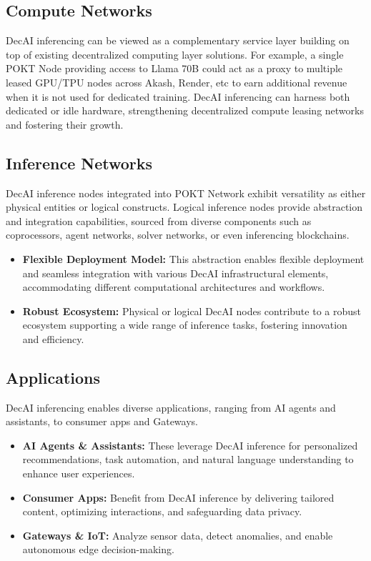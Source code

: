 \documentclass[conference,compsoc]{IEEEtran}
\begin{document}
\subsection{Compute Networks}
DecAI inferencing can be viewed as a complementary service layer building on top of existing decentralized computing layer solutions. For example, a single POKT Node providing access to Llama 70B could act as a proxy to multiple leased GPU/TPU nodes across Akash, Render, etc to earn additional revenue when it is not used for dedicated training. DecAI inferencing can harness both dedicated or idle hardware, strengthening decentralized compute leasing networks and fostering their growth.

\subsection{Inference Networks}
DecAI inference nodes integrated into POKT Network exhibit versatility as either physical entities or logical constructs. Logical inference nodes provide abstraction and integration capabilities, sourced from diverse components such as coprocessors, agent networks, solver networks, or even inferencing blockchains.

\begin{itemize}
    \item \textbf{Flexible Deployment Model:} This abstraction enables flexible deployment and seamless integration with various DecAI infrastructural elements, accommodating different computational architectures and workflows.

    \item \textbf{Robust Ecosystem:} Physical or logical DecAI nodes contribute to a robust ecosystem supporting a wide range of inference tasks, fostering innovation and efficiency.

\end{itemize}

\subsection{Applications}
DecAI inferencing enables diverse applications, ranging from AI agents and assistants, to consumer apps and Gateways.
\begin{itemize}
    \item \textbf{AI Agents \& Assistants:} These leverage DecAI inference for personalized recommendations, task automation, and natural language understanding to enhance user experiences.

    \item \textbf{Consumer Apps:} Benefit from DecAI inference by delivering tailored content, optimizing interactions, and safeguarding data privacy.

    \item \textbf{Gateways \& IoT:} Analyze sensor data, detect anomalies, and enable autonomous edge decision-making.
\end{itemize}
\end{document}
